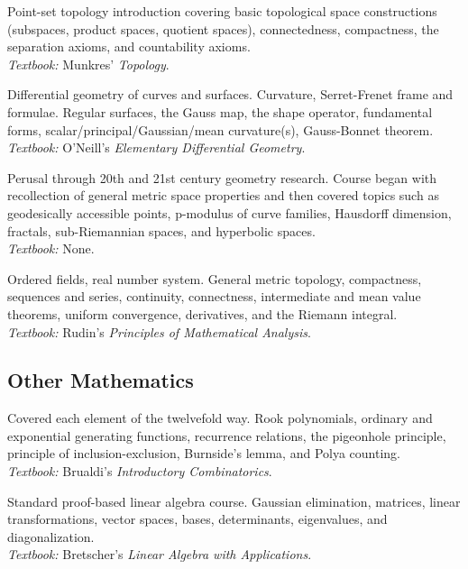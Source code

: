 \documentclass[11pt,letterpaper,sans]{moderncv}
\begin{document}
%
  {Point-set topology introduction covering basic topological space constructions (subspaces, product spaces, quotient spaces), connectedness, compactness, the separation axioms, and countability axioms. \\ \emph{Textbook: }Munkres' \emph{Topology}.}

%
  {Differential geometry of curves and surfaces. Curvature, Serret-Frenet frame and formulae. Regular surfaces, the Gauss map, the shape operator, fundamental forms, scalar/principal/Gaussian/mean curvature(s), Gauss-Bonnet theorem. \\ \emph{Textbook: }O'Neill's \emph{Elementary Differential Geometry}.}

%
  {Perusal through 20th and 21st century geometry research. Course began with recollection of general metric space properties and then covered topics such as geodesically accessible points, p-modulus of curve families, Hausdorff dimension, fractals, sub-Riemannian spaces, and hyperbolic spaces.  \\ \emph{Textbook: }None.}

%
  {Ordered fields, real number system. General metric topology, compactness, sequences and series, continuity, connectness, intermediate and mean value theorems, uniform convergence, derivatives, and the Riemann integral. \\ \emph{Textbook: }Rudin's \emph{Principles of Mathematical Analysis}.}



\subsection{Other Mathematics}

%
  {Covered each element of the twelvefold way. Rook polynomials, ordinary and exponential generating functions, recurrence relations, the pigeonhole principle, principle of inclusion-exclusion, Burnside's lemma, and Polya counting.   \\ \emph{Textbook: }Brualdi's \emph{Introductory Combinatorics}.}

%
  {Standard proof-based linear algebra course. Gaussian elimination, matrices, linear transformations, vector spaces, bases, determinants, eigenvalues, and diagonalization.\\ \emph{Textbook: }Bretscher's \emph{Linear Algebra with Applications}.}
\end{document}
